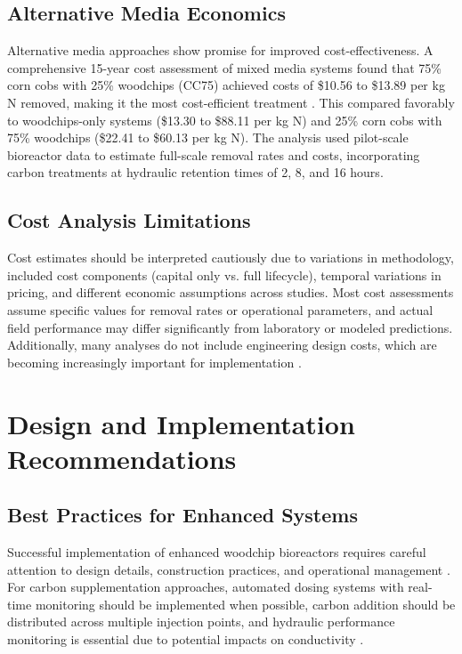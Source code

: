 \documentclass[12pt,a4paper]{article}
\begin{document}
\subsection{Alternative Media Economics}

Alternative media approaches show promise for improved cost-effectiveness. A comprehensive 15-year cost assessment of mixed media systems found that 75\% corn cobs with 25\% woodchips (CC75) achieved costs of \$10.56 to \$13.89 per kg N removed, making it the most cost-efficient treatment \citep{new_ref_4}. This compared favorably to woodchips-only systems (\$13.30 to \$88.11 per kg N) and 25\% corn cobs with 75\% woodchips (\$22.41 to \$60.13 per kg N). The analysis used pilot-scale bioreactor data to estimate full-scale removal rates and costs, incorporating carbon treatments at hydraulic retention times of 2, 8, and 16 hours.

\subsection{Cost Analysis Limitations}

Cost estimates should be interpreted cautiously due to variations in methodology, included cost components (capital only vs. full lifecycle), temporal variations in pricing, and different economic assumptions across studies. Most cost assessments assume specific values for removal rates or operational parameters, and actual field performance may differ significantly from laboratory or modeled predictions. Additionally, many analyses do not include engineering design costs, which are becoming increasingly important for implementation \citep{RN312}.

\section{Design and Implementation Recommendations}

\subsection{Best Practices for Enhanced Systems}

Successful implementation of enhanced woodchip bioreactors requires careful attention to design details, construction practices, and operational management \citep{RN310, RN312}. For carbon supplementation approaches, automated dosing systems with real-time monitoring should be implemented when possible, carbon addition should be distributed across multiple injection points, and hydraulic performance monitoring is essential due to potential impacts on conductivity \citep{RN242}.
\end{document}
